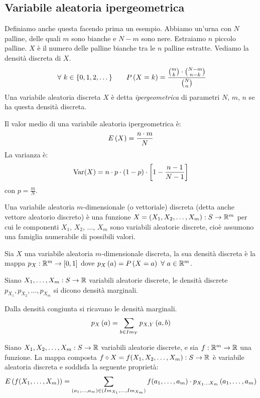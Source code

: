 \subsection{Variabile aleatoria ipergeometrica}

\begin{defn}
Definiamo anche questa facendo prima un esempio. Abbiamo un'urna con $N$ palline, delle quali $m$ sono bianche e $N - m$ sono nere. Estraiamo $n$ piccolo palline. $X$ \`e il numero delle palline bianche tra le $n$ palline estratte. Vediamo la densit\`a discreta di $X$.
\[
\forall k \in \{ 0, 1, 2, \dots \} \qquad \prob{X = k} = \frac{\binom{m}{k} \cdot \binom{N - m}{n - k}}{\binom{N}{n}}
\]
Una variabile aleatoria discreta $X$ \`e detta \emph{ipergeometrica} di parametri $N$, $m$, $n$ se ha questa densit\`a discreta.

Il valor medio di una variabile aleatoria ipergeometrica \`e:
\[
\expect{X} = \frac{n \cdot m}{N}
\]
La varianza \`e:
\[
\var (X) = n \cdot p \cdot (1 - p) \cdot \left[ 1 - \frac{n - 1}{N - 1} \right]
\]
con $p = \frac{m}{N}$.
\end{defn}

\begin{defn}
Una variabile aleatoria $m$-dimensionale (o vettoriale) discreta (detta anche vettore aleatorio discreto) \`e una funzione $X = (X_1, X_2, \ldots, X_m) : S \to \reals^m$ per cui le componenti $X_1$, $X_2$, $\ldots$, $X_m$ sono variabili aleatorie discrete, cio\`e assumono una famiglia numerabile di possibili valori.
\end{defn}

\begin{defn}
Sia $X$ una variabile aleatoria $m$-dimensionale discreta, la sua densit\`a discreta \`e la mappa $p_X : \reals^m \to [0,1]$ dove $\mass{a} = \prob{X = a} \forall a \in \reals^m$.
\end{defn}
Siano $X_1, \ldots, X_m : S \to \reals$ variabili aleatorie discrete, le densit\`a discrete $p_{X_1}, p_{X_2}, \ldots, p_{X_m}$ si dicono densit\`a marginali.

\begin{prop}
Dalla densit\`a congiunta si ricavano le densit\`a marginali.
\[
\mass{a} = \sum_{b \in \image{Y}} \mass[X,Y]{a,b}
\]
\end{prop}

\begin{prop}
Siano $X_1, X_2, \ldots, X_m : S \to \reals$ variabili aleatorie discrete, e sia $f : \reals^m \to \reals$ una funzione. La mappa composta $f \circ X = f(X_1, X_2, \ldots, X_m) : S \to \reals$ \`e variabile aleatoria discreta e soddisfa la seguente propriet\`a:
\[
\expect{f(X_1, \ldots, X_m)} = \sum_{(a_1, \ldots, a_m) \in (\image{X_1},  \ldots, \image{X_m})} f(a_1, \ldots, a_m) \cdot \mass[X_1 \ldots X_m]{a_1, \ldots, a_m}
\]
\end{prop}

